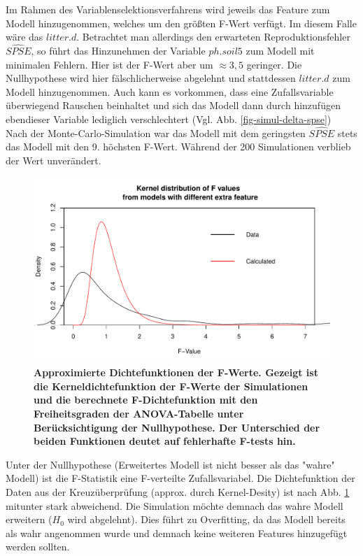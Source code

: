 Im Rahmen des Variablenselektionsverfahrens wird jeweils das Feature zum Modell hinzugenommen, welches um den größten F-Wert verfügt.
Im diesem Falle wäre das $litter.d$.
Betrachtet man allerdings den erwarteten Reproduktionsfehler $\widehat{SPSE}$, so führt das Hinzunehmen der Variable $ph.soil5$ zum Modell mit minimalen Fehlern.
Hier ist der F-Wert aber um $\approx 3,5$ geringer.
Die Nullhypothese wird hier fälschlicherweise abgelehnt und stattdessen $litter.d$ zum Modell hinzugenommen.
Auch kann es vorkommen, dass eine Zufallsvariable überwiegend Rauschen beinhaltet und sich das Modell dann durch hinzufügen ebendieser Variable lediglich verschlechtert (Vgl. Abb. \ref{fig-simul-delta-spse})
\\
Nach der Monte-Carlo-Simulation war das Modell mit dem geringsten $\widehat{SPSE}$ stets das Modell mit den 9. höchsten F-Wert.
Während der 200 Simulationen verblieb der Wert unverändert.
\\
\begin{figure}[htbp]
	\centering
	\includegraphics[width=\textwidth]{fig/simul/kernel.pdf}
	\caption{\bf{Approximierte Dichtefunktionen der F-Werte.} 
		Gezeigt ist die Kerneldichtefunktion der F-Werte der Simulationen und die berechnete F-Dichtefunktion mit den Freiheitsgraden der ANOVA-Tabelle unter Berücksichtigung der Nullhypothese.
		Der Unterschied der beiden Funktionen deutet auf fehlerhafte F-tests hin.
	}
	\label{fig-simul-kernel}
\end{figure}
Unter der Nullhypothese (Erweitertes Modell ist nicht besser als das "wahre" Modell) ist die F-Statistik eine F-verteilte Zufallsvariabel.
Die Dichtefunktion der Daten aus der Kreuzüberprüfung (approx. durch Kernel-Desity) ist nach Abb. \ref{fig-simul-kernel} mitunter stark abweichend.
Die Simulation möchte demnach das wahre Modell erweitern ($H_0$ wird abgelehnt).
Dies führt zu Overfitting, da das Modell bereits als wahr angenommen wurde und demnach keine weiteren Features hinzugefügt werden sollten.


